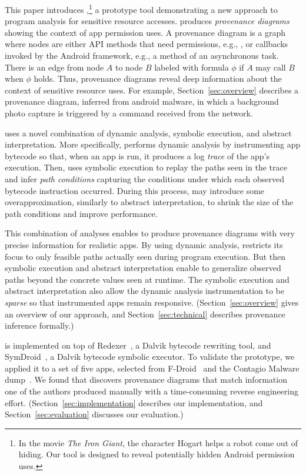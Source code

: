 This paper introduces \hogarth{},\footnote{In the movie \textit{The Iron Giant}, 
the character Hogart helps a robot come out of hiding. Our tool is designed 
to reveal potentially hidden Android permission uses.} a prototype tool demonstrating a 
new approach to program analysis for sensitive resource accesses. 
\hogarth{} produces
\emph{provenance diagrams} showing the context of app permission
uses. A provenance diagram is a graph where nodes are either API
methods that need permissions, e.g., ,
or callbacks invoked by the Android framework, e.g., a
 method of an asynchronous task. There is an edge
from node $A$ to node $B$ labeled with formula $\phi$ if $A$ may call
$B$ when $\phi$ holds. Thus, provenance diagrams reveal deep 
information about the context of sensitive resource uses.
For example, Section~\ref{sec:overview} describes a
provenance diagram, inferred from android malware, in which
a background photo capture is 
triggered by a command received from the network.

\hogarth{} uses a novel combination of dynamic analysis, symbolic
execution, and abstract interpretation. More specifically,
\hogarth{} performs dynamic analysis by instrumenting app bytecode
so that, when an app is run, it produces a log \emph{trace} of the app's
execution. Then, \hogarth{} uses symbolic execution to replay the
paths seen in the trace and infer \emph{path conditions} capturing the
conditions under which each observed bytecode instruction
occurred. During this process, \hogarth{} may introduce some
overapproximation, similarly to abstract interpretation, to shrink the
size of the path conditions and improve performance.

This combination of analyses enables \hogarth{} to produce
provenance diagrams with very precise information for realistic
apps. By using dynamic analysis,
\hogarth{} restricts its focus to only feasible paths actually seen
during program execution. But then symbolic execution and abstract
interpretation enable \hogarth{} to generalize observed paths
beyond the concrete values seen at runtime.
The symbolic execution and abstract interpretation also allow the 
dynamic analysis instrumentation to be \emph{sparse} so that
instrumented apps remain responsive. 
(Section~\ref{sec:overview} gives an overview of our approach, and
Section~\ref{sec:technical} describes provenance inference formally.)

\hogarth{} is implemented on top of Redexer~\cite{jsjeon:spsm12},
a Dalvik bytecode rewriting tool, and
SymDroid~\cite{jeon:2012:symdroid}, a Dalvik bytecode symbolic
executor.  To validate the \hogarth{} prototype, we applied it to a
set of five apps, selected from F-Droid~\cite{fdroid} and the Contagio
Malware dump~\cite{contagio}. We found that \hogarth{} discovers
provenance diagrams that match information one of the authors produced
manually with a time-consuming reverse engineering
effort. %
(Section~\ref{sec:implementation} describes our implementation, and Section~\ref{sec:evaluation} discusses our evaluation.)


